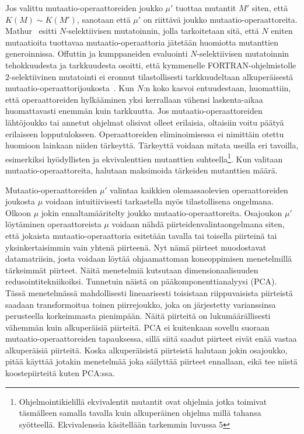 \documentclass[finnish]{tktltiki2}
\begin{document}
Jos valittu mutaatio-operaattoreiden joukko $\mu'$ tuottaa mutantit $M'$ siten, että $K(M) \sim K(M')$, sanotaan että $\mu'$ on riittävä joukko mutaatio-operaattoreita. Mathur~\cite{Mathur91} esitti $N$-selektiivisen mutatoinnin, jolla tarkoitetaan sitä, että $N$ eniten mutaatioita tuottavaa mu\-taa\-tio\--ope\-raatto\-ria jätetään huomiotta mutanttien generoinnissa. Offuttin ja kumppaneiden evaluointi $N$-selektiivisen mutatoinnin tehokkuudesta ja tarkkuudesta osoitti, että kymmenelle FORTRAN-ohjelmistolle $2$-selektiivinen mutatointi ei eronnut tilastollisesti tarkkuudeltaan alkuperäisestä mu\-taa\-tio\--ope\-raatto\-ri\-joukosta~\cite{OffuttRZ93}. Kun $N$:n koko kasvoi entuudestaan, huomattiin, että operaattoreiden hylkääminen yksi kerrallaan vähensi laskenta-aikaa huomattavasti enemmän kuin tarkkuutta. Jos mu\-taa\-tio\--ope\-raatto\-reiden lähtöjoukko tai annetut ohjelmat olisivat olleet erilaisia, oltaisiin voitu päätyä erilaiseen lopputulokseen. Operaattoreiden eliminoimisessa ei nimittäin otettu huomioon lainkaan niiden tärkeyttä. Tärkeyttä voidaan mitata useilla eri tavoilla, esimerkiksi hyödyllisten ja ekvivalenttien mutanttien suhteella\footnote{Ohjelmointikielillä ekvivalentit mutantit ovat ohjelmia jotka toimivat täsmälleen samalla tavalla kuin alkuperäinen ohjelma millä tahansa syötteellä. Ekvivalenssia käsitellään tarkemmin luvussa 5}. Kun valitaan mu\-taa\-tio\--ope\-raatto\-reita, halutaan maksimoida tärkeiden mutanttien määrä.

Mu\-taa\-tio\--ope\-raatto\-reiden $\mu'$ valintaa kaikkien olemassaolevien operaattoreiden joukosta $\mu$ voidaan intuitiivisesti tarkastella myös tilastollisena ongelmana. Olkoon $\mu$ jokin ennaltamääritelty joukko mu\-taa\-tio\--ope\-raatto\-reita. Osajoukon $\mu'$ löytäminen operaattoreista $\mu$ voidaan nähdä piirteidenvalintaongelmana siten, että jokaista mu\-taa\-tio\--ope\-raatto\-ria esitetään tavalla tai toisella piirteinä tai yksinkertaisimmin vain yhtenä piirteenä. Nyt nämä piirteet muodostavat datamatriisin, josta voidaan löytää ohjaamattoman koneoppimisen menetelmillä tärkeimmät piirteet. Näitä menetelmiä kutsutaan dimensionaalisuuden redusointitekniikoiksi. Tunnetuin näistä on pääkomponenttianalyysi (PCA). Tässä menetelmässä mahdollisesti lineaarisesti toisistaan riippuvaisista piirteistä saadaan transformoitua toinen piirrejoukko, joka on järjestetty varianssinsa perusteella korkeimmasta pienimpään. Näitä piirteitä on lukumäärällisesti vähemmän kuin alkuperäisiä piirteitä. PCA ei kuitenkaan sovellu suoraan mu\-taa\-tio\--ope\-raatto\-reiden tapauksessa, sillä siitä saadut piirteet eivät enää vastaa alkuperäisiä piirteitä. Koska alkuperäisistä piirteistä halutaan jokin osajoukko, pitää käyttää jotakin menetelmää joka säilyttää piirteet ennallaan, eikä tee niistä koostepiirteitä kuten PCA:ssa. 
\end{document}
